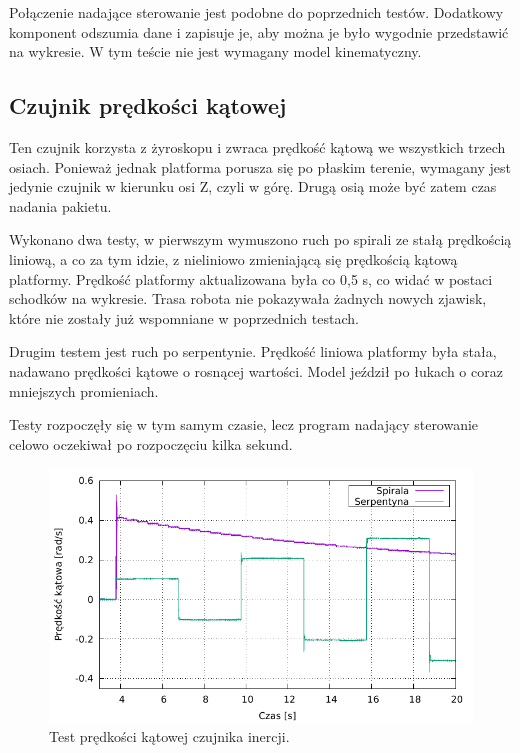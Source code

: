 	Połączenie nadające sterowanie jest podobne do poprzednich testów.
	Dodatkowy komponent odszumia dane i zapisuje je, aby można je było wygodnie przedstawić na wykresie.
	W tym teście nie jest wymagany model kinematyczny.
	
	\subsection{Czujnik prędkości kątowej}
		Ten czujnik korzysta z żyroskopu i zwraca prędkość kątową we wszystkich trzech osiach.
		Ponieważ jednak platforma porusza się po płaskim terenie, wymagany jest jedynie czujnik w kierunku osi Z, czyli w górę.
		Drugą osią może być zatem czas nadania pakietu.
		
		Wykonano dwa testy, w pierwszym wymuszono ruch po spirali ze stałą prędkością liniową, a co za tym idzie, z nieliniowo zmieniającą się prędkością kątową platformy.
		Prędkość platformy aktualizowana była co 0,5 s, co widać w postaci schodków na wykresie.
		Trasa robota nie pokazywała żadnych nowych zjawisk, które nie zostały już wspomniane w poprzednich testach.
		
		Drugim testem jest ruch po serpentynie.
		Prędkość liniowa platformy była stała, nadawano prędkości kątowe o rosnącej wartości. Model jeździł po łukach o coraz mniejszych promieniach.
		
		Testy rozpoczęły się w tym samym czasie, lecz program nadający sterowanie celowo oczekiwał po rozpoczęciu kilka sekund.
		
		\begin{figure}[H]
		\centering
			\includegraphics[width=\textwidth]{plots/wewucho_angular.pdf}
			\caption{Test prędkości kątowej czujnika inercji.}
			\label{plot:wewucho_angular}
		\end{figure}
		

